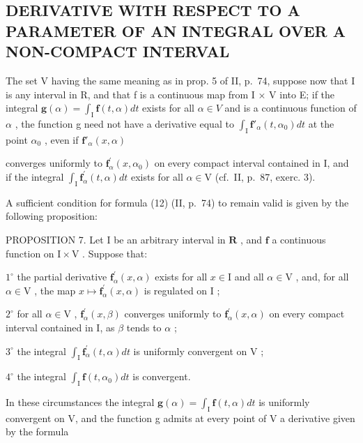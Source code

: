 \subsection{DERIVATIVE WITH RESPECT TO A PARAMETER OF AN INTEGRAL OVER A NON-COMPACT INTERVAL}

The set V having the same meaning as in prop. 5 of II, p.~74, suppose now that I is any interval in R, and that f is a continuous map from I × V into E; if the integral \(\mathbf{g}(\alpha) = \int_{\mathrm{I}} \mathbf{f}(t, \alpha) dt\) exists for all \(\alpha \in V\) and is a continuous function of \(\alpha\) , the function g need not have a derivative equal to \(\int_{\mathrm{I}} \mathbf{f}'_{\alpha}(t, \alpha_0) dt\) at the point \(\alpha_0\) , even if \(\mathbf{f}'_{\alpha}(x, \alpha)\)

converges uniformly to \(\mathbf{f}_{\alpha}^{\prime}(x,\alpha_{0})\) on every compact interval contained in I, and if the integral \(\int_{\mathrm{I}}\mathbf{f}_{\alpha}^{\prime}(t,\alpha)dt\) exists for all \(\alpha \in \mathrm{V}\) (cf.~II, p.~87, exerc. 3).

A sufficient condition for formula (12) (II, p.~74) to remain valid is given by the following proposition:

PROPOSITION 7. Let I be an arbitrary interval in \(\mathbf{R}\) , and \(\mathbf{f}\) a continuous function on \(\mathrm{I} \times \mathrm{V}\) . Suppose that:

\(1^{\circ}\) the partial derivative \(\mathbf{f}_{\alpha}^{\prime}(x,\alpha)\) exists for all \(x\in \mathrm{I}\) and all \(\alpha \in \mathrm{V}\) , and, for all \(\alpha \in \mathrm{V}\) , the map \(x\mapsto \mathbf{f}_{\alpha}^{\prime}(x,\alpha)\) is regulated on \(\mathrm{I}\) ;

\(2^{\circ}\) for all \(\alpha \in \mathrm{V}\) , \(\mathbf{f}_{\alpha}^{\prime}(x,\beta)\) converges uniformly to \(\mathbf{f}_{\alpha}^{\prime}(x,\alpha)\) on every compact interval contained in I, as \(\beta\) tends to \(\alpha\) ;

\(3^{\circ}\) the integral \(\int_{\mathrm{I}}\mathbf{f}_{\alpha}^{\prime}(t,\alpha)dt\) is uniformly convergent on \(\mathrm{V}\) ;

\(4^{\circ}\) the integral \(\int_{\mathrm{I}}\mathbf{f}(t,\alpha_0)dt\) is convergent.

In these circumstances the integral \(\mathbf{g}(\alpha)=\int_{\mathrm{I}}\mathbf{f}(t,\alpha)dt\) is uniformly convergent on V, and the function g admits at every point of V a derivative given by the formula

